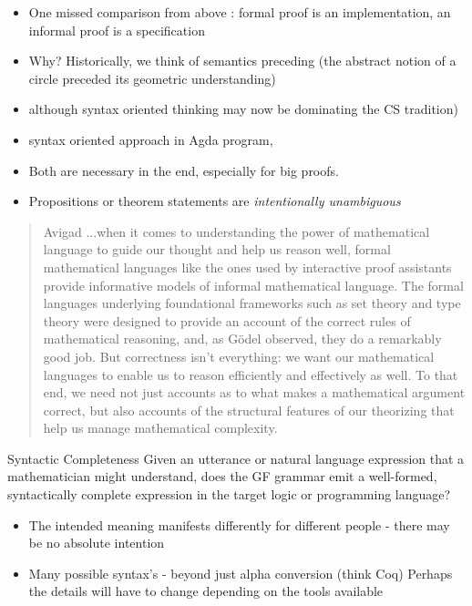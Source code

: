 \documentclass[10pt]{beamer}
\begin{document}
\begin{frame}

\begin{itemize}
\item One missed comparison from above :  formal proof is an implementation, an informal proof is a specification

\item Why? Historically, we think of semantics preceding (the abstract notion of a
  circle preceded its geometric understanding)
\item although syntax oriented thinking may now be dominating the CS tradition)
\item syntax oriented approach in Agda program,
\item Both are necessary in the end, especially for big proofs.
\item  Propositions or theorem statements are \emph{intentionally unambiguous}

\end{itemize}
  
  
\end{frame}

\begin{frame}
\begin{quote}{Avigad}
...when it comes to understanding the power of mathematical language to guide
our thought and help us reason well, formal mathematical languages like the ones
used by interactive proof assistants provide informative models of informal
mathematical language. The formal languages underlying foundational frameworks
such as set theory and type theory were designed to provide an account of the
correct rules of mathematical reasoning, and, as Gödel observed, they do a
remarkably good job. But correctness isn’t everything: we want our mathematical
languages to enable us to reason efficiently and effectively as well. To that
end, we need not just accounts as to what makes a mathematical argument correct,
but also accounts of the structural features of our theorizing that help us
manage mathematical complexity.
\end{quote}
\end{frame}

\begin{frame}
\begin{block}{Syntactic Completeness}
Given an utterance or natural language expression that a mathematician might
understand, does the GF grammar emit a well-formed, syntactically complete
expression in the target logic or programming language?
\end{block}

\begin{itemize}

\item The intended meaning manifests differently for different people - there
  may be no absolute intention
\item Many possible syntax's - beyond just alpha conversion (think Coq) Perhaps the details will have to change depending on the tools available 

\end{itemize}

\end{frame}
\end{document}
